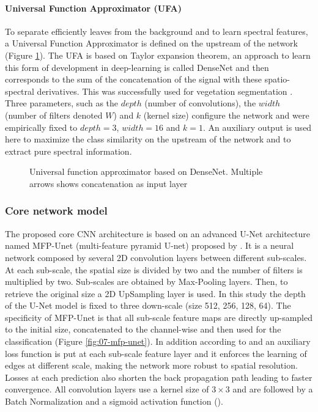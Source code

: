 \documentclass[../thesis.tex]{subfiles}
\begin{document}
    \paragraph{Universal Function Approximator (UFA)} To separate efficiently leaves from the background and to learn spectral features, a Universal Function Approximator is defined on the upstream of the network (Figure \ref{fig:07-ufa}). The UFA is based on Taylor expansion theorem, an approach to learn this form of development in deep-learning is called DenseNet and then corresponds to the sum of the concatenation of the signal with these spatio-spectral derivatives. This was successfully used for vegetation segmentation \cite{Vayssade2021}. Three parameters, such as the $depth$ (number of convolutions), the $width$ (number of filters denoted $W$) and $k$ (kernel size) configure the network and were empirically fixed to $depth=3$, $width=16$ and $k=1$. An auxiliary output is used here to maximize the class similarity on the upstream of the network and to extract pure spectral information.
    
    \begin{figure}[H]
        \centering
        
        \caption{Universal function approximator based on DenseNet. Multiple arrows shows concatenation as input layer}
        \label{fig:07-ufa}
    \end{figure}
    
    \newpage
    \subsubsection{Core network model}
    
    The proposed core CNN architecture is based on an advanced U-Net architecture named MFP-Unet (multi-feature pyramid U-net) proposed by \cite{moradi2019mfp}. It is a neural network composed by several 2D convolution layers between different sub-scales. %
    At each sub-scale, the spatial size is divided by two and the number of filters is multiplied by two. Sub-scales are obtained by Max-Pooling layers. Then, to retrieve the original size a 2D UpSampling layer is used. In this study the depth of the U-Net model is fixed to three down-scale (size 512, 256, 128, 64). The specificity of MFP-Unet is that all sub-scale feature maps are directly up-sampled to the initial size, concatenated to the channel-wise and then used for the classification (Figure \ref{fig:07-mfp-unet}). In addition according to \cite{morris2018pyramid} and \cite{xie2020instanceaware} an auxiliary loss function is put at each sub-scale feature layer and it enforces the learning of edges at different scale, making the network more robust to spatial resolution. Losses at each  prediction also shorten the back propagation path leading to faster convergence. All convolution layers use a kernel size of $3\times3$ and are followed by a Batch Normalization and a sigmoid activation function (\cite{moradi2019mfp, nwankpa2018activation}).
    
\end{document}
